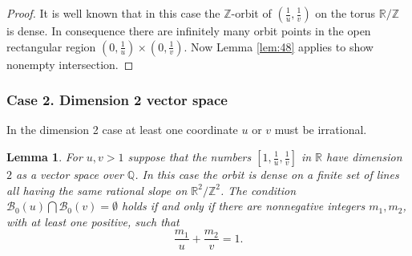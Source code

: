 \documentclass[12pt,letterpaper, reqno]{amsart}
\newtheorem{lem}[thm]{Lemma}
\theoremstyle{definition}
\theoremstyle{remark}
\newcommand{\RR}{\ensuremath{\mathbb{R}}}
\newcommand{\ZZ}{\ensuremath{\mathbb{Z}}}
\newcommand{\QQ}{\mathbb{Q}}
\newcommand{\sB}{{\mathcal B}}
\begin{document}
\begin{proof}
It is well known that in this case the $\ZZ$-orbit of $(\frac{1}{u}, \frac{1}{v})$
on the torus $\RR/\ZZ$ is dense. In consequence there are infinitely many
orbit points in the open rectangular region $(0, \frac{1}{u}) \times (0, \frac{1}{v})$. Now
Lemma \ref{lem:48} applies to show nonempty intersection.  
\end{proof}


\subsubsection{Case 2. Dimension 2 vector space}\label{sec:432}

In the dimension 2 case at least one coordinate $u$ or $v$ must be irrational.

\begin{lem}\label{lem:410}
 For $u, v >1$ suppose that the numbers $[1, \frac{1}{u}, \frac{1}{v}]$  in $\RR$ have dimension $2$
 as a vector space over $\QQ$. In this case the orbit is dense on a finite set of lines all having the 
 same rational slope on $\RR^2/\ZZ^2$.  The condition
 $ \sB_0(u) \bigcap \sB_0(v) =  \emptyset$
 holds if and only if there are nonnegative integers $m_1,  m_2$, with at least one positive,  such that
 $$
 \frac{m_1}{u} + \frac{m_2}{v} =1.
 $$
\end{lem}
\end{document}

